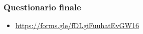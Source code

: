
\begin{exampleframe}
    \frametitle{Questionario finale}

    \begin{itemize}
        \item \url{https://forms.gle/fDLgiFuuhatEvGW16}
    \end{itemize}
\end{exampleframe}
